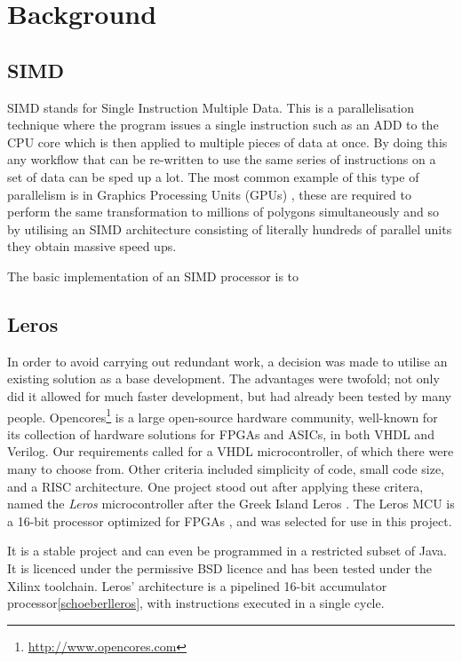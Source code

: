 \section{Background}
\subsection{SIMD}

SIMD stands for Single Instruction Multiple Data.  This is a parallelisation
technique where the program issues a single instruction such as an ADD to the
CPU core which is then applied to multiple pieces of data at once.  By doing
this any workflow that can be re-written to use the same series of instructions
on a set of data can be sped up a lot.  The most common example of this type of
parallelism is in Graphics Processing Units (GPUs)
\cite{Fatahalian:2008:CLG:1400181.1400197}, these are required to perform the
same transformation to millions of polygons simultaneously and so by utilising
an SIMD architecture consisting of literally hundreds of parallel units they
obtain massive speed ups.

The basic implementation of an SIMD processor is to 

\subsection{Leros}
In order to avoid carrying out redundant work, a decision was made to utilise an
existing solution as a base development. The advantages were twofold; not only
did it allowed for much faster development, but had already been tested by many
people. Opencores\footnote{\url{http://www.opencores.com}}
is a large open-source hardware community, well-known for its collection of hardware solutions for
FPGAs and ASICs, in both VHDL and Verilog. Our requirements called for a VHDL
microcontroller, of which there were many to choose from. Other criteria included
simplicity of code, small code size, and a RISC architecture. One project stood out
after applying these critera, named the \emph{Leros} microcontroller after the
Greek Island Leros \cite{schoeberlleros}.  The Leros MCU is a 16-bit
processor optimized for FPGAs \cite{schoeberlleros}, and was selected for use in this
project.

 It is a stable
project and can even be programmed in a restricted subset of Java. It is licenced
under the permissive BSD licence and has been tested under the Xilinx toolchain.
Leros' architecture is a pipelined 16-bit accumulator processor\ref{schoeberlleros},
with instructions executed in a single cycle.

